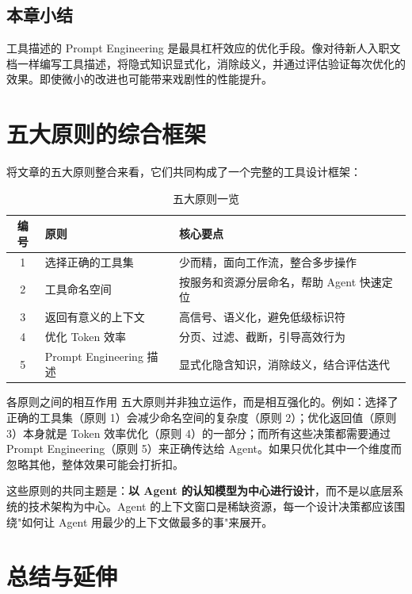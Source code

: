 \documentclass[a4paper]{article}
\begin{document}
\subsection{本章小结}

工具描述的 Prompt Engineering 是最具杠杆效应的优化手段。像对待新人入职文档一样编写工具描述，将隐式知识显式化，消除歧义，并通过评估验证每次优化的效果。即使微小的改进也可能带来戏剧性的性能提升。


\section{五大原则的综合框架}

将文章的五大原则整合来看，它们共同构成了一个完整的工具设计框架：

\begin{table}[H]
\centering
\caption{五大原则一览}
\begin{tabular}{clp{}}
\toprule
\textbf{编号} & \textbf{原则} & \textbf{核心要点} \\
\midrule
1 & 选择正确的工具集 & 少而精，面向工作流，整合多步操作 \\
2 & 工具命名空间 & 按服务和资源分层命名，帮助 Agent 快速定位 \\
3 & 返回有意义的上下文 & 高信号、语义化，避免低级标识符 \\
4 & 优化 Token 效率 & 分页、过滤、截断，引导高效行为 \\
5 & Prompt Engineering 描述 & 显式化隐含知识，消除歧义，结合评估迭代 \\
\bottomrule
\end{tabular}
\end{table}

\begin{warningbox}{各原则之间的相互作用}
五大原则并非独立运作，而是相互强化的。例如：选择了正确的工具集（原则 1）会减少命名空间的复杂度（原则 2）；优化返回值（原则 3）本身就是 Token 效率优化（原则 4）的一部分；而所有这些决策都需要通过 Prompt Engineering（原则 5）来正确传达给 Agent。如果只优化其中一个维度而忽略其他，整体效果可能会打折扣。
\end{warningbox}

这些原则的共同主题是：\textbf{以 Agent 的认知模型为中心进行设计}，而不是以底层系统的技术架构为中心。Agent 的上下文窗口是稀缺资源，每一个设计决策都应该围绕"如何让 Agent 用最少的上下文做最多的事"来展开。


\section{总结与延伸}
\end{document}
